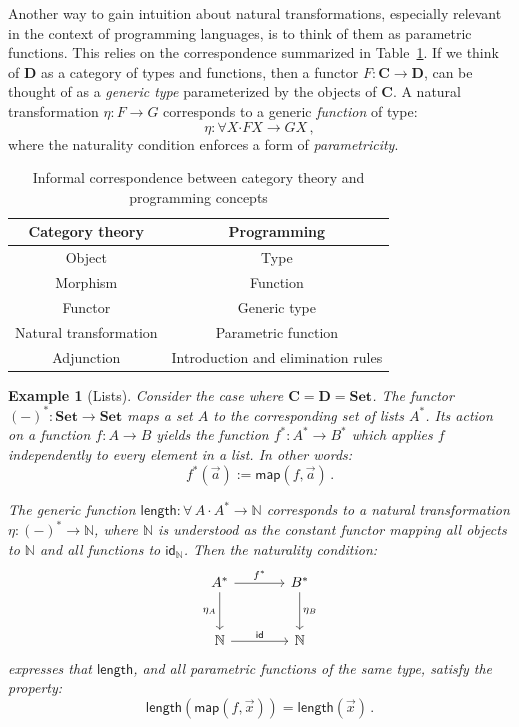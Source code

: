 \documentclass[11pt,oneside]{book}
\newtheorem{example}[theorem]{Example}
\theoremstyle{definition}
\newcommand{\kw}[1]{\ensuremath{ \mathsf{#1} }}
\newcommand{\bdot}{\boldsymbol{\cdot}}
\begin{document}
Another way to gain intuition about natural transformations,
especially relevant in the context of programming languages,
is to think of them as parametric functions.
This relies on the correspondence summarized in Table~\ref{tbl:catpl}.
If we think of $\mathbf{D}$ as a category of types and functions,
then a functor
$F : \mathbf{C} \rightarrow \mathbf{D}$,
can be thought of as a \emph{generic type}
parameterized by the objects of $\mathbf{C}$.
A natural transformation $\eta : F \rightarrow G$
corresponds to a generic \emph{function} of type:
\[
  \eta : \forall X \bdot
    F X \rightarrow G X
  \,,
\]
where the naturality condition
enforces a form of \emph{parametricity}.

\begin{table} %
  \centering
  \begin{tabular}{cc}
    \hline
    Category theory & Programming \\
    \hline
    Object & Type \\
    Morphism & Function \\
    Functor & Generic type \\
    Natural transformation & Parametric function \\
    Adjunction & Introduction and elimination rules \\
    \hline
  \end{tabular}
  \caption{Informal correspondence between category theory and
    programming concepts}
  \label{tbl:catpl}
\end{table}

\begin{example}[Lists]
Consider the case where
$\mathbf{C} = \mathbf{D} = \mathbf{Set}$.
The functor $(-)^* : \mathbf{Set} \rightarrow \mathbf{Set}$
maps a set $A$ to the corresponding set of lists $A^*$.
Its action on a function  $f : A \rightarrow B$
yields the function $f^* : A^* \rightarrow B^*$
which applies $f$ independently to every element in a list.
In other words:
\[
  f^*(\vec{a}) := \kw{map}(f, \vec{a})
  \,.
\]

The generic function
$
  \kw{length} : \forall \, A \, \bdot \, A^* \rightarrow \mathbb{N}
$
corresponds to a natural transformation
$\eta : (-)^* \rightarrow \mathbb{N}$,
where $\mathbb{N}$ is understood as the constant functor
mapping all objects to $\mathbb{N}$ and all functions to $\kw{id}_\mathbb{N}$.
Then the naturality condition:
\[
  \begin{tikzcd}[sep=large]
    A^* \ar[r, "f^*"] \ar[d, "\eta_A"'] & B^* \ar[d, "\eta_B"] \\
    \mathbb{N} \ar[r, "\kw{id}"] & \mathbb{N}
  \end{tikzcd}
\]
expresses that \kw{length},
and all parametric functions of the same type,
satisfy the property:
\[
  \kw{length}(\kw{map}(f, \vec{x})) = \kw{length}(\vec{x})
  \,.
\]
\end{example}
\end{document}
